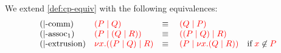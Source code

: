 \begin{definition}\label{def:nc-equiv}
  We extend \cref{def:cp-equiv} with the following equivalences:
  \[
    \begin{array}{llll}
      (|\text{-comm})
      & \textcolor{red}{(P \mid Q)}
      & \equiv \;
      & \textcolor{red}{(Q \mid P)}
      \\
      (|\text{-assoc}_1)
      & \textcolor{red}{(P \mid (Q \mid R))}
      & \equiv \;
      & \textcolor{red}{((P \mid Q) \mid R)}
      \\
      ({|}\text{-extrusion})
      & \textcolor{red}{\nu x.((P \mid Q) \mid R)}
      & \equiv \;
      & \textcolor{red}{(P \mid \nu x.(Q \mid R))} \quad \text{if} \; \textcolor{red}{x}\not\in\textcolor{red}{P} 
    \end{array}
  \]
\end{definition} 
